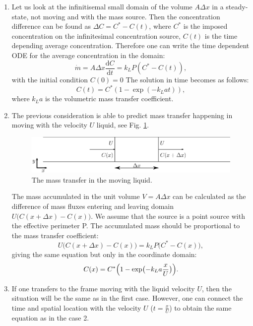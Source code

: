 \documentclass{article}
\newcommand{\beq}{\begin{equation}}
\newcommand{\feq}{\end{equation}}
\begin{document}
\begin{enumerate}
\item
Let us look at the infinitisemal small domain of the volume $A \Delta x$ in a steady-state, not
moving and with the mass source. Then the concentration difference can be found as $\Delta C = C^* -
C(t)$, where $C^*$ is the imposed concentration on the infinitesimal concentration source, $C(t)$ is
the time depending average concentration. Therefore one can write the time dependent ODE for the
average concentration in the domain:
\beq
\dot{m}= A \Delta x \frac{\mathrm{d}C}{\mathrm{d} t} = k_L P (C^{*}-C(t)), 
\feq
with the initial condition $C(0)=0$
The solution in time becomes as follows:
\beq
C(t)= C^{*}(1-\exp(-k_L a t )), 
\feq
where $k_L a$ is the volumetric mass transfer coefficient.

\item
The previous consideration is able to predict mass transfer happening in moving with the velocity
$U$ liquid, see Fig. \ref{fig:moving:frame}.
\begin{figure}[htb!]
\includegraphics[width=\textwidth]{Figures/mass_transfer.eps}
\caption{The mass transfer in the moving liquid. \label{fig:moving:frame}}
\end{figure}

The mass accumulated in the unit volume $V=A \Delta x$ can be calculated as the difference of 
mass fluxes entering and leaving domain $U \bigl(C(x+\Delta x)-C(x)\bigr)$. We assume that the
source is a point source with the effective perimeter P. The accumulated mass should be proportional
to the mass transfer coefficient:
\beq
U \bigl(C(x+\Delta x)-C(x)\bigr)=k_L P \bigl(C^{*}-C(x)\bigr), 
\feq 
giving the same equation but only in the coordinate domain:
\beq
C(x)= C^{*}\Bigl(1-\exp\bigl(-k_L a \frac{x}{U} \bigr)\Bigr).
\label{main:mass:transfer:expression} 
\feq

\item If one transfers to the frame moving with the liquid velocity $U$, then the situation will be
the same as in the first case. However, one can connect the time and spatial location with the
velocity $U$ ($t=\frac{x}{U}$) to obtain the same equation as in the case 2.
\end{enumerate}
\end{document}
